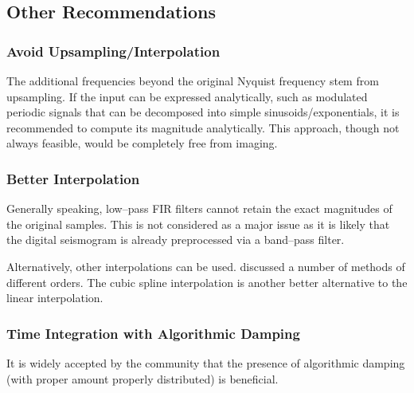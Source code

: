 \subsection{Other Recommendations}
\subsubsection{Avoid Upsampling/Interpolation}
The additional frequencies beyond the original Nyquist frequency stem from upsampling. If the input can be expressed analytically, such as modulated periodic signals that can be decomposed into simple sinusoids/exponentials, it is recommended to compute its magnitude analytically. This approach, though not always feasible, would be completely free from imaging.
\subsubsection{Better Interpolation}
Generally speaking, low--pass FIR filters cannot retain the exact magnitudes of the original samples. This is not considered as a major issue as it is likely that the digital seismogram is already preprocessed via a band--pass filter.

Alternatively, other interpolations can be used. \citet{Lee1989} discussed a number of methods of different orders. The cubic spline interpolation \citep[see][\S~3.5]{Burden2011} is another better alternative to the linear interpolation.
\subsubsection{Time Integration with Algorithmic Damping}\label{sec:algo_damping}
It is widely accepted by the community that the presence of algorithmic damping (with proper amount properly distributed) is beneficial.

